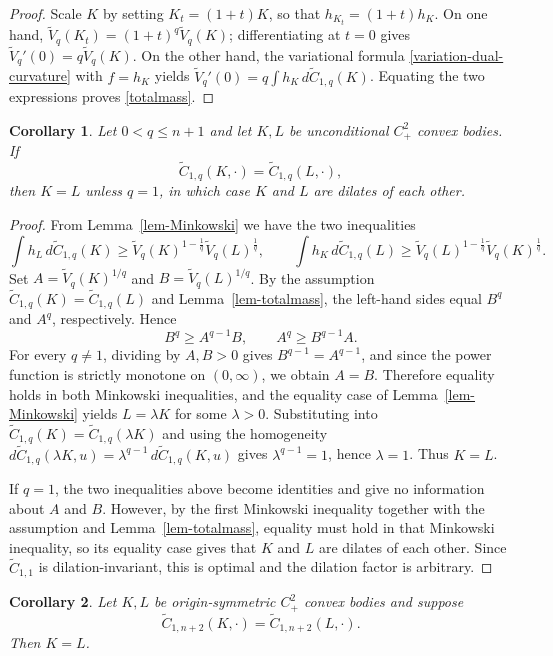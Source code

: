 \documentclass[12pt,leqno]{amsart}
\theoremstyle{plain} \newtheorem{thm}{Theorem}[section]
\theoremstyle{plain} \newtheorem{prop}[thm]{Proposition}
\theoremstyle{plain} \newtheorem{prob}[thm]{Problem}
\theoremstyle{definition} \newtheorem{defi}[thm]{Definition}
\theoremstyle{plain} \newtheorem{cor}[thm]{Corollary}
\theoremstyle{plain} \newtheorem{lem}[thm]{Lemma}
\theoremstyle{plain} \newtheorem{eg}{Example}[section]
\theoremstyle{remark} \newtheorem{rmk}[thm]{Remark}
\theoremstyle{plain} \newtheorem{conj}{Conjecture}
\numberwithin{equation}{section}
\newcommand{\tV}{\widetilde V}
\newcommand{\tC}{\widetilde C}
\begin{document}
\begin{proof}
  Scale $K$ by setting $K_t=(1+t)K$, so that $h_{K_t}=(1+t)h_K$.
  On one hand, $\tV_q(K_t)=(1+t)^q\tV_q(K)$; differentiating at $t=0$
  gives $\tV_q'(0)=q\tV_q(K)$.  On the other hand, the variational
  formula \eqref{variation-dual-curvature} with $f=h_K$ yields
  $\tV_q'(0)=q\int h_K\,d\tC_{1,q}(K)$.  Equating the two expressions
  proves \eqref{totalmass}.
\end{proof}

\begin{cor}\label{cor-uniqueness-1}
  Let $0<q\le n+1$ and let $K,L$ be unconditional $C^2_+$ convex
  bodies.  If
  \[
    \tC_{1,q}(K,\cdot)=\tC_{1,q}(L,\cdot),
  \]
  then $K=L$ unless $q=1$, in which case $K$ and $L$ are dilates of each other.
\end{cor}

\begin{proof}
  From Lemma~\ref{lem-Minkowski} we have the two inequalities
  \[
    \int h_L\,d\tC_{1,q}(K) \ge \tV_q(K)^{1-\frac1q}\tV_q(L)^{\frac1q}, \qquad
    \int h_K\,d\tC_{1,q}(L) \ge \tV_q(L)^{1-\frac1q}\tV_q(K)^{\frac1q}.
  \]
  Set $A=\tV_q(K)^{1/q}$ and $B=\tV_q(L)^{1/q}$.  By the assumption
  $\tC_{1,q}(K)=\tC_{1,q}(L)$ and Lemma~\ref{lem-totalmass}, the
  left-hand sides equal $B^q$ and $A^q$, respectively. Hence
  \[
    B^q \ge A^{q-1}B,\qquad A^q \ge B^{q-1}A.
  \]
  For every $q\neq1$, dividing by $A,B>0$ gives
  $B^{q-1}=A^{q-1}$, and since the power function is strictly
  monotone on $(0,\infty)$, we obtain $A=B$. Therefore equality holds
  in both Minkowski inequalities, and the equality case of
  Lemma~\ref{lem-Minkowski} yields $L=\lambda K$ for some
  $\lambda>0$.  Substituting into $\tC_{1,q}(K)=\tC_{1,q}(\lambda K)$
  and using the homogeneity
  $d\tC_{1,q}(\lambda K,u)=\lambda^{q-1}\,d\tC_{1,q}(K,u)$ gives  $\lambda^{q-1}=1$, hence $\lambda=1$. Thus $K=L$.

  If $q=1$, the two inequalities above become identities and give no
  information about $A$ and $B$.  However, by the first Minkowski
  inequality together with the assumption and Lemma~\ref{lem-totalmass}, equality must hold in that Minkowski inequality, so its equality case gives that $K$ and $L$ are dilates of each other.
  Since $\tC_{1,1}$ is dilation-invariant, this is optimal and the
  dilation factor is arbitrary.
\end{proof}

\begin{cor}\label{cor-uniqueness-endpoint}
  Let $K,L$ be origin‑symmetric $C^2_+$ convex bodies and suppose
  \[
    \tC_{1,n+2}(K,\cdot)=\tC_{1,n+2}(L,\cdot).
  \]
  Then $K=L$.
\end{cor}
\end{document}
